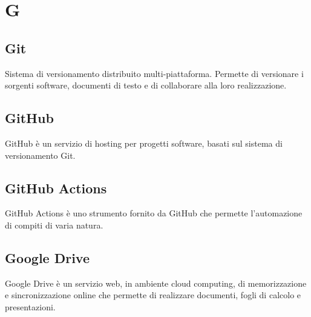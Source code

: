 \section{G}
	\subsection{Git}  
		Sistema di versionamento distribuito multi-piattaforma. Permette di versionare i sorgenti software, documenti di testo e di collaborare alla loro realizzazione.
	\subsection{GitHub}  
		GitHub è un servizio di hosting per progetti software, basati sul sistema di versionamento Git.
	\subsection{GitHub Actions}  
		GitHub Actions è uno strumento fornito da GitHub che permette l'automazione di compiti di varia natura.
	\subsection{Google Drive}  
		Google Drive è un servizio web, in ambiente cloud computing, di memorizzazione e sincronizzazione online che permette di realizzare documenti, fogli di calcolo e presentazioni.



\newpage